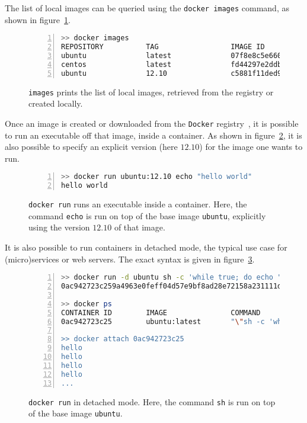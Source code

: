 \documentclass[a4paper]{jpconf}
\begin{document}
The list of local images can be queried using the \texttt{docker images}
command, as shown in figure~\ref{fig-docker-images}.

\begin{figure}[h]
	\begin{lstlisting}[language=sh,
		basicstyle=\tiny,
		frame=trbl,
		numbers=left,
		showstringspaces=false,
	stringstyle=\ttfamily]
>> docker images
REPOSITORY          TAG                 IMAGE ID            CREATED             VIRTUAL SIZE
ubuntu              latest              07f8e8c5e660        5 days ago          188.3 MB
centos              latest              fd44297e2ddb        2 weeks ago         215.7 MB
ubuntu              12.10               c5881f11ded9        10 months ago       172.1 MB
\end{lstlisting}
\caption{\label{fig-docker-images}\texttt{images} prints the list of local
images, retrieved from the registry or created locally.}
\end{figure}

Once an image is created or downloaded from the \texttt{Docker}
registry~\cite{ref-docker-hub},
it is possible to run an executable off that image, inside a container.
As shown in figure~\ref{fig-docker-run-hello}, it is also possible to specify an
explicit version (here $12.10$) for the image one wants to run.

\begin{figure}[h]
	\begin{lstlisting}[language=sh,
		basicstyle=\tiny,
		frame=trbl,
		numbers=left,
		showstringspaces=false,
	stringstyle=\ttfamily]
>> docker run ubuntu:12.10 echo "hello world"
hello world
\end{lstlisting}
\caption{\label{fig-docker-run-hello}\texttt{docker run} runs an executable
inside a container.
Here, the command \texttt{echo} is run on top of the base image \texttt{ubuntu},
explicitly using the version $12.10$ of that image.}
\end{figure}

It is also possible to run containers in detached mode, the typical use case for
(micro)services or web servers.
The exact syntax is given in figure~\ref{fig-docker-run-detached}.

\begin{figure}[h]
	\begin{lstlisting}[language=sh,
		basicstyle=\tiny,
		frame=trbl,
		numbers=left,
		showstringspaces=false,
	stringstyle=\ttfamily]
>> docker run -d ubuntu sh -c 'while true; do echo "hello"; sleep 1; done;'
0ac942723c259a4963e0feff04d57e9bf8ad28e72158a231111d8f3718d960e6

>> docker ps
CONTAINER ID        IMAGE               COMMAND                CREATED         STATUS
0ac942723c25        ubuntu:latest       "\"sh -c 'while true   6 seconds ago   Up 3 seconds

>> docker attach 0ac942723c25
hello
hello
hello
hello
...
\end{lstlisting}
\caption{\label{fig-docker-run-detached}\texttt{docker run} in detached mode.
Here, the command \texttt{sh} is run on top of the base image \texttt{ubuntu}.}
\end{figure}
\end{document}
